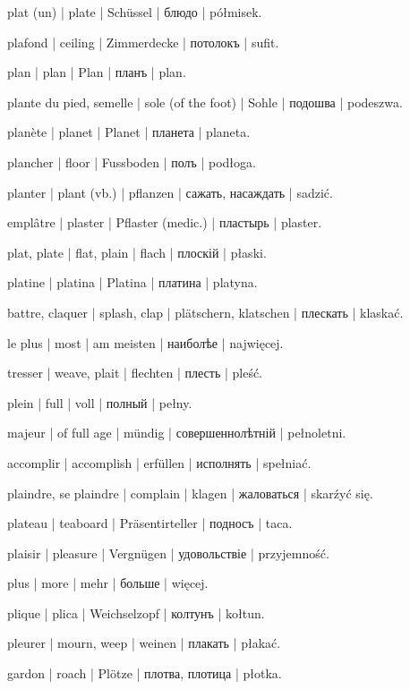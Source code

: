 \begin{outdent}{1em}
plat (un) | plate | Schüssel | блюдо | półmisek.

plafond | ceiling | Zimmerdecke | потолокъ | sufit.

plan | plan | Plan | планъ | plan.

plante du pied, semelle | sole (of the foot) | Sohle | подошва | podeszwa.

planète | planet | Planet | планета | planeta.

plancher | floor | Fussboden | полъ | podłoga.

planter | plant (vb.) | pflanzen | сажать, насаждать | sadzić.

emplâtre | plaster | Pflaster (medic.) | пластырь | plaster.

plat, plate | flat, plain | flach | плоскій | płaski.

platine | platina | Platina | платина | platyna.

battre, claquer | splash, clap | plätschern, klatschen | плескать | klaskać.

le plus | most | am meisten | наиболѣе | najwięcej.

tresser | weave, plait | flechten | плесть | pleść.

plein | full | voll | полный | pełny.

\uvsubentry{}
majeur | of full age | mündig | совершеннолѣтній | pełnoletni.


\uvsubentry{}
accomplir | accomplish | erfüllen | исполнять | spełniać.

plaindre, se plaindre | complain | klagen | жаловаться | skarźyć się.

plateau | teaboard | Präsentirteller | подносъ | taca.

plaisir | pleasure | Vergnügen | удовольствіе | przyjemność.

plus | more | mehr | больше | więcej.

plique | plica | Weichselzopf | колтунъ | kołtun.

pleurer | mourn, weep | weinen | плакать | płakać.

gardon | roach | Plötze | плотва, плотица | płotka.


\end{outdent}
